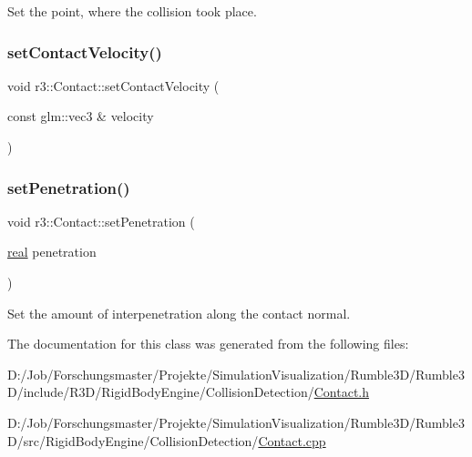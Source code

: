 Set the point, where the collision took place. \mbox{\label{classr3_1_1_contact_a7ccc2c56a4dcc5b16967f9832fea87ab}} 
\subsubsection{\texorpdfstring{set\+Contact\+Velocity()}{setContactVelocity()}}
{\footnotesize\ttfamily void r3\+::\+Contact\+::set\+Contact\+Velocity (\begin{DoxyParamCaption}\item[{const glm\+::vec3 \&}]{velocity }\end{DoxyParamCaption})}

\mbox{\label{classr3_1_1_contact_a828feb22ff02fe787739eb5d87cfec38}} 
\subsubsection{\texorpdfstring{set\+Penetration()}{setPenetration()}}
{\footnotesize\ttfamily void r3\+::\+Contact\+::set\+Penetration (\begin{DoxyParamCaption}\item[{\mbox{\hyperlink{namespacer3_ab2016b3e3f743fb735afce242f0dc1eb}{real}}}]{penetration }\end{DoxyParamCaption})}

Set the amount of interpenetration along the contact normal. 

The documentation for this class was generated from the following files\+:\begin{DoxyCompactItemize}
\item 
D\+:/\+Job/\+Forschungsmaster/\+Projekte/\+Simulation\+Visualization/\+Rumble3\+D/\+Rumble3\+D/include/\+R3\+D/\+Rigid\+Body\+Engine/\+Collision\+Detection/\mbox{\hyperlink{_contact_8h}{Contact.\+h}}\item 
D\+:/\+Job/\+Forschungsmaster/\+Projekte/\+Simulation\+Visualization/\+Rumble3\+D/\+Rumble3\+D/src/\+Rigid\+Body\+Engine/\+Collision\+Detection/\mbox{\hyperlink{_contact_8cpp}{Contact.\+cpp}}\end{DoxyCompactItemize}
